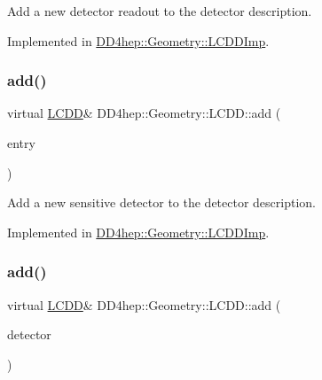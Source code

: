 Add a new detector readout to the detector description. 



Implemented in \hyperlink{class_d_d4hep_1_1_geometry_1_1_l_c_d_d_imp_a387c7f1ec836f427515add50ca1c51ad}{D\+D4hep\+::\+Geometry\+::\+L\+C\+D\+D\+Imp}.

\hypertarget{class_d_d4hep_1_1_geometry_1_1_l_c_d_d_a6c10312be5b4fdf8132e25eae6abdac0}{}\label{class_d_d4hep_1_1_geometry_1_1_l_c_d_d_a6c10312be5b4fdf8132e25eae6abdac0} 
\subsubsection{\texorpdfstring{add()}{add()}\hspace{0.1cm}{\footnotesize\ttfamily [7/10]}}
{\footnotesize\ttfamily virtual \hyperlink{class_d_d4hep_1_1_geometry_1_1_l_c_d_d}{L\+C\+DD}\& D\+D4hep\+::\+Geometry\+::\+L\+C\+D\+D\+::add (\begin{DoxyParamCaption}\item[{\hyperlink{class_d_d4hep_1_1_geometry_1_1_sensitive_detector}{Sensitive\+Detector}}]{entry }\end{DoxyParamCaption})\hspace{0.3cm}{\ttfamily [pure virtual]}}



Add a new sensitive detector to the detector description. 



Implemented in \hyperlink{class_d_d4hep_1_1_geometry_1_1_l_c_d_d_imp_a2b9390272a836536b6ffb8545165f0db}{D\+D4hep\+::\+Geometry\+::\+L\+C\+D\+D\+Imp}.

\hypertarget{class_d_d4hep_1_1_geometry_1_1_l_c_d_d_a9b756dac3f0ebc5393072f23c96cb490}{}\label{class_d_d4hep_1_1_geometry_1_1_l_c_d_d_a9b756dac3f0ebc5393072f23c96cb490} 
\subsubsection{\texorpdfstring{add()}{add()}\hspace{0.1cm}{\footnotesize\ttfamily [8/10]}}
{\footnotesize\ttfamily virtual \hyperlink{class_d_d4hep_1_1_geometry_1_1_l_c_d_d}{L\+C\+DD}\& D\+D4hep\+::\+Geometry\+::\+L\+C\+D\+D\+::add (\begin{DoxyParamCaption}\item[{\hyperlink{class_d_d4hep_1_1_geometry_1_1_det_element}{Det\+Element}}]{detector }\end{DoxyParamCaption})\hspace{0.3cm}{\ttfamily [pure virtual]}}



